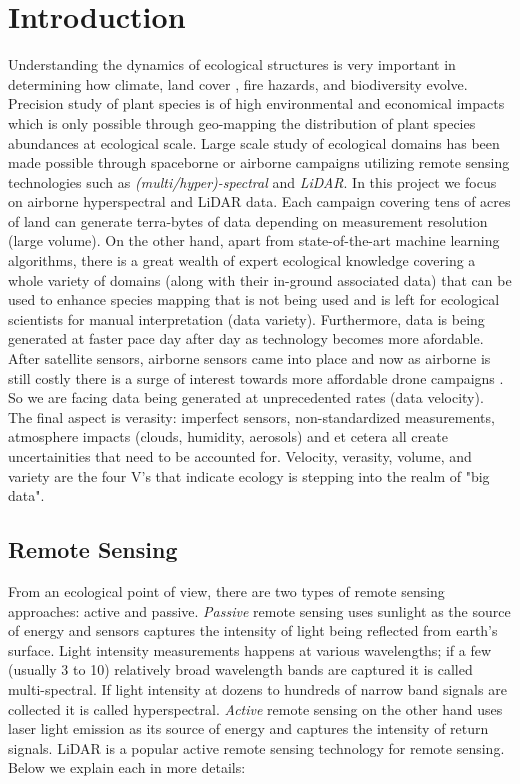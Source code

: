 \chapter{Introduction}%

Understanding the dynamics of ecological structures is very important in determining how climate, %
land cover %
, fire hazards, and biodiversity evolve. Precision study of plant species is of high environmental and economical impacts which is only possible through geo-mapping the distribution of plant species abundances at ecological scale. Large scale study of ecological domains has been made possible through spaceborne or airborne campaigns utilizing remote sensing technologies such as \textit{(multi/hyper)-spectral} and \textit{LiDAR}. In this project we focus on airborne hyperspectral and LiDAR data. Each campaign covering tens of acres of land can generate terra-bytes of data depending on measurement resolution (large volume). On the other hand, apart from state-of-the-art machine learning algorithms, there is a great wealth of expert ecological knowledge covering a whole variety of domains (along with their in-ground associated data) that can be used to enhance species mapping that is not being used and is left for ecological scientists for manual interpretation (data variety). Furthermore, data is being generated at faster pace day after day as technology becomes more afordable. After satellite sensors, airborne sensors came into place and now as airborne is still costly there is a surge of interest towards more affordable drone campaigns \citep{zhou2009foreword}. So we are facing data being generated at unprecedented rates (data velocity). The final aspect is verasity: imperfect sensors, non-standardized measurements, atmosphere impacts (clouds, humidity, aerosols) and et cetera all create uncertainities that need to be accounted for. Velocity, verasity, volume, and variety are the four V's that indicate ecology is stepping into the realm of "big data"\citep{hampton2013big, soranno2014macrosystems}.

\section{Remote Sensing}

From an ecological point of view, there are two types of remote sensing approaches: active and passive. \textit{Passive} remote sensing uses sunlight as the source of energy and sensors captures the intensity of light being reflected from earth's surface. Light intensity measurements happens at various wavelengths; if a few (usually 3 to 10) relatively broad wavelength bands are captured it is called multi-spectral. If light intensity at dozens to hundreds of narrow band signals are collected it is called hyperspectral. \textit{Active} remote sensing on the other hand uses laser light emission as its source of energy and captures the intensity of return signals. LiDAR is a popular active remote sensing technology for remote sensing. Below we explain each in more details:

